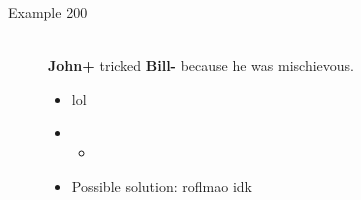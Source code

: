 \documentclass{article}
\newcommand{\insertcode}[2]{\begin{itemize}\item[]\end{itemize}} %
\begin{document}
\begin{description}

  \item[Example 200] \hfill \\
  {\bf John+} tricked {\bf Bill-} because he was mischievous.
  \begin{itemize}
  	\item lol
  	\item \insertcode{"Scripts/example.pl"}{Example}
  	\item Possible solution: roflmao idk
  \end{itemize}

  

\end{description}

\end{document}
